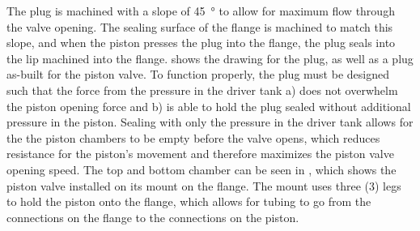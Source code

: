 The plug is machined with a slope of \SI{45}{\degree} to allow for maximum flow through the valve opening. The sealing surface of the flange is machined to match this slope, and when the piston presses the plug into the flange, the plug seals into the lip machined into the flange.  shows the drawing for the plug, as well as a plug as-built for the piston valve. To function properly, the plug must be designed such that the force from the pressure in the driver tank a) does not overwhelm the piston opening force and b) is able to hold the plug sealed without additional pressure in the piston. Sealing with only the pressure in the driver tank allows for the the piston chambers to be empty before the valve opens, which reduces resistance for the piston's movement and therefore maximizes the piston valve opening speed. The top and bottom chamber can be seen in , which shows the piston valve installed on its mount on the flange. The mount uses three (3) legs to hold the piston onto the flange, which allows for tubing to go from the connections on the flange to the connections on the piston.




